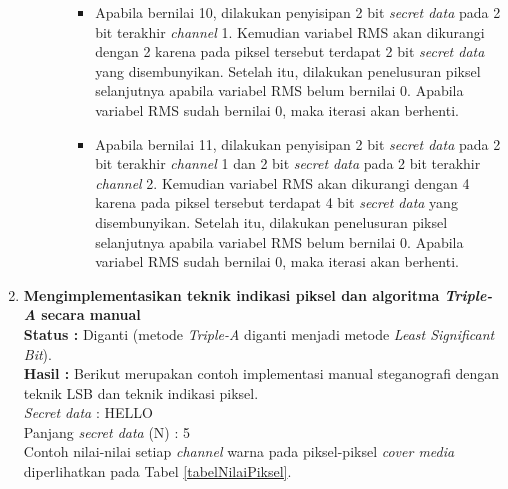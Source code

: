 \documentclass[a4paper,twoside]{article}
\begin{document}
\begin{enumerate}
\begin{itemize}
\begin{itemize}
\begin{itemize}
				\item Apabila bernilai 10, dilakukan penyisipan 2 bit \textit{secret data} pada 2 bit terakhir \textit{channel} 1. Kemudian variabel RMS akan dikurangi dengan 2 karena pada piksel tersebut terdapat 2 bit \textit{secret data} yang disembunyikan. Setelah itu, dilakukan penelusuran piksel selanjutnya apabila variabel RMS belum bernilai 0. Apabila variabel RMS sudah bernilai 0, maka iterasi akan berhenti.
				\item Apabila bernilai 11, dilakukan penyisipan 2 bit \textit{secret data} pada 2 bit terakhir \textit{channel} 1 dan 2 bit \textit{secret data} pada 2 bit terakhir \textit{channel} 2. Kemudian variabel RMS akan dikurangi dengan 4 karena pada piksel tersebut terdapat 4 bit \textit{secret data} yang disembunyikan. Setelah itu, dilakukan penelusuran piksel selanjutnya apabila variabel RMS belum bernilai 0. Apabila variabel RMS sudah bernilai 0, maka iterasi akan berhenti.\\
			\end{itemize}		
		\end{itemize}		
		\end{itemize}				
		
		\item \textbf{Mengimplementasikan teknik indikasi piksel dan algoritma \textit{Triple-A} secara manual}\\
		{\bf Status :} Diganti (metode \textit{Triple-A} diganti menjadi metode \textit{Least Significant Bit}).\\
		{\bf Hasil :} Berikut merupakan contoh implementasi manual steganografi dengan teknik LSB dan teknik indikasi piksel.\\
		
		\textit{Secret data} : HELLO\\
		Panjang \textit{secret data} (N) : 5\\
		Contoh nilai-nilai setiap \textit{channel} warna pada piksel-piksel \textit{cover media} diperlihatkan pada Tabel \ref{tabelNilaiPiksel}.\\
		

\end{enumerate}
\end{document}
